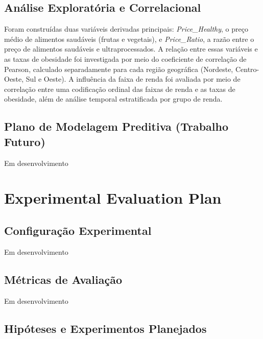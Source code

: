 \documentclass[kdmile,a4paper]{kdmile}
\begin{document}
\subsection{Análise Exploratória e Correlacional}

Foram construídas duas variáveis derivadas principais: \textit{Price\_Healthy}, o preço
médio de alimentos saudáveis (frutas e vegetais), e \textit{Price\_Ratio}, a razão entre
o preço de alimentos saudáveis e ultraprocessados. A relação entre essas variáveis e as
taxas de obesidade foi investigada por meio do coeficiente de correlação de Pearson,
calculado separadamente para cada região geográfica (Nordeste, Centro-Oeste, Sul e
Oeste). A influência da faixa de renda foi avaliada por meio de correlação entre uma
codificação ordinal das faixas de renda e as taxas de obesidade, além de análise
temporal estratificada por grupo de renda.

\subsection{Plano de Modelagem Preditiva (Trabalho Futuro)}

Em desenvolvimento


\section{Experimental Evaluation Plan}
\label{sec:experiments}


\subsection{Configuração Experimental}

Em desenvolvimento

\subsection{Métricas de Avaliação}

Em desenvolvimento

\subsection{Hipóteses e Experimentos Planejados}
\end{document}
